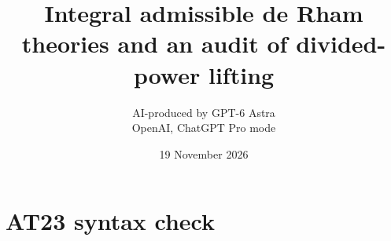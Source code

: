 \documentclass[11pt,a4paper]{article}
\title{Integral admissible de Rham theories and an audit of divided-power lifting}
\author{AI-produced by GPT-6 Astra\\OpenAI, ChatGPT Pro mode}
\date{19 November 2026}
\theoremstyle{definition}
\begin{document}
\section{AT23 syntax check}

\end{document}
